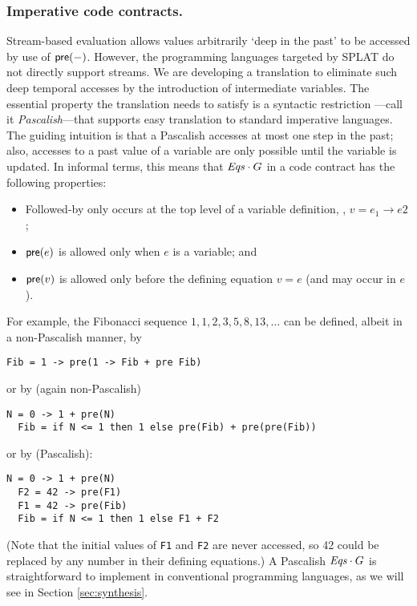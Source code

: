 \subsubsection*{Imperative code contracts.}

Stream-based evaluation allows values arbitrarily `deep in the past'
to be accessed by use of $\mathsf{pre}(-)$. However, the programming
languages targeted by SPLAT do not directly support streams.  We are
developing a translation to eliminate such deep temporal accesses by
the introduction of intermediate variables. The essential property the
translation needs to satisfy is a syntactic restriction ---call
it \emph{Pascalish}---that supports easy translation to standard
imperative languages.  The guiding intuition is that a Pascalish
{\Eqs} accesses at most one step in the past; also, accesses to a
past value of a variable are only possible until the variable is
updated. In informal terms, this means that ${\mathit{Eqs}}\cdot G$ in a code
contract has the following properties:
\begin{itemize}
\item Followed-by only occurs at the top level of a variable definition, \eg, $v = e_1 \to e2$;
\item $\mathsf{pre}(e)$ is allowed only when $e$ is a variable; and
\item $\mathsf{pre}(v)$ is allowed only before the defining equation $v = e$ (and may occur in $e$).
\end{itemize}
For example, the Fibonacci sequence $1,1,2,3,5,8,13,\ldots$ can be
defined, albeit in a non-Pascalish manner, by
{\small
\begin{lstlisting}[style=agree]
  Fib = 1 -> pre(1 -> Fib + pre Fib)
\end{lstlisting}
}
\noindent or by (again non-Pascalish)
{\small
\begin{lstlisting}[style=agree]
  N = 0 -> 1 + pre(N)
  Fib = if N <= 1 then 1 else pre(Fib) + pre(pre(Fib))
\end{lstlisting}
}
\noindent or by (Pascalish):
{\small
\begin{lstlisting}[style=agree]
  N = 0 -> 1 + pre(N)
  F2 = 42 -> pre(F1)
  F1 = 42 -> pre(Fib)
  Fib = if N <= 1 then 1 else F1 + F2
\end{lstlisting}
}
(Note that the initial values of \verb+F1+ and \verb+F2+ are never
accessed, so 42 could be replaced by any number in their defining
equations.) A Pascalish ${\mathit{Eqs}} \cdot G$ is straightforward to
implement in conventional programming languages, as we will see in
Section \ref{sec:synthesis}.

